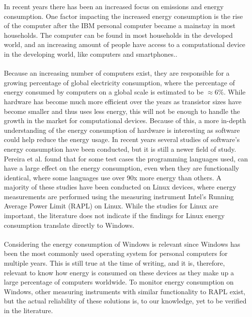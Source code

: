
In recent years there has been an increased focus on emissions and energy consumption. One factor impacting the increased energy consumption is the rise of the computer after the IBM personal computer became a mainstay in most households. The computer can be found in most households in the developed world, and an increasing amount of people have access to a computational device in the developing world, like computers and smartphones.\cite{DevelopedWorldPC}. 

\paragraph*{}
Because an increasing number of computers exist, they are responsible for a growing percentage of global electricity consumption, where the percentage of energy consumed by computers on a global scale is estimated to be $\approx 6\%$\cite{somavat2011energy}. While hardware has become much more efficient over the years as transistor sizes have become smaller and thus uses less energy, this will not be enough to handle the growth in the market for computational devices\cite{procaccianti2011profiling}. Because of this, a more in-depth understanding of the energy consumption of hardware is interesting as software could help reduce the energy usage\cite{somavat2011energy}. In recent years several studies of software's energy consumption have been conducted, but it is still a newer field of study. Pereira et al.\cite{Pereira2017} found that for some test cases the programming languages used, can have a large effect on the energy consumption, even when they are functionally identical, where some languages use over 90x more energy than others. A majority of these studies have been conducted on Linux devices, where energy measurements are performed using the measuring instrument Intel's Running Average Power Limit (RAPL) on Linux. While the studies for Linux are important, the literature does not indicate if the findings for Linux energy consumption translate directly to Windows\cite{Pereira2017}. 

\paragraph*{}
Considering the energy consumption of Windows is relevant since Windows has been the most commonly used operating system for personal computers for multiple years. This is still true at the time of writing, and it is, therefore, relevant to know how energy is consumed on these devices as they make up a large percentage of computers worldwide\cite{OSShare}. To monitor energy consumption on Windows, other measuring instruments with similar functionality to RAPL exist, but the actual reliability of these solutions is, to our knowledge, yet to be verified in the literature.


